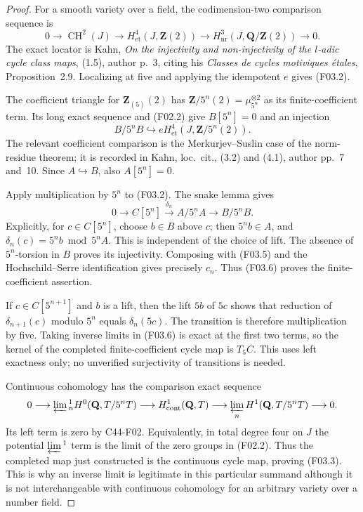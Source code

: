\documentclass[11pt]{article}
\theoremstyle{remark}\newtheorem{remark}[theorem]{Remark}
\begin{document}
\begin{proof}
For a smooth variety over a field, the codimension-two
comparison sequence is
\[
 0\longrightarrow\operatorname{CH}^2(J)
 \longrightarrow H^4_{\mathrm{et}}(J,\mathbf Z(2))
 \longrightarrow H^3_{\mathrm{nr}}(J,\mathbf Q/\mathbf Z(2))
 \longrightarrow0.
\]
The exact locator is Kahn, \emph{On the injectivity and
non-injectivity of the $l$-adic cycle class maps}, (1.5),
author p.~3, citing his \emph{Classes de cycles motiviques
\'etales}, Proposition~2.9.  Localizing at five and applying
the idempotent $e$ gives (F03.2).

The coefficient triangle for $\mathbf Z_{(5)}(2)$ has
$\mathbf Z/5^n(2)=\mu_{5^n}^{\otimes2}$ as its finite-coefficient
term.  Its long exact sequence and (F02.2) give
$B[5^n]=0$ and an injection
\[
 B/5^nB\hookrightarrow
       eH^4_{\mathrm{et}}(J,\mathbf Z/5^n(2)).     \tag{F03.5}
\]
The relevant coefficient comparison is the Merkurjev--Suslin
case of the norm-residue theorem; it is recorded in Kahn,
loc.~cit., (3.2) and (4.1), author pp.~7 and~10.
Since $A\hookrightarrow B$, also $A[5^n]=0$.

Apply multiplication by $5^n$ to (F03.2).  The snake lemma gives
\[
 0\longrightarrow C[5^n]\xrightarrow{\delta_n}A/5^nA
 \longrightarrow B/5^nB.
 \tag{F03.6}
\]
Explicitly, for $c\in C[5^n]$, choose $b\in B$ above $c$;
then $5^n b\in A$, and
$\delta_n(c)=5^n b\bmod5^nA$.  This is independent of the
choice of lift.  The absence of $5^n$-torsion in $B$ proves
its injectivity.  Composing with (F03.5) and the
Hochschild--Serre identification gives precisely $c_n$.
Thus (F03.6) proves the finite-coefficient assertion.

If $c\in C[5^{n+1}]$ and $b$ is a lift, then the lift $5b$
of $5c$ shows that reduction of $\delta_{n+1}(c)$ modulo $5^n$
equals $\delta_n(5c)$.  The transition is therefore multiplication
by five.  Taking inverse limits in (F03.6) is exact at the first
two terms, so the kernel of the completed finite-coefficient
cycle map is $T_5C$.  This uses left exactness only; no
unverified surjectivity of transitions is needed.

Continuous cohomology has the comparison exact sequence
\[
 0\longrightarrow\varprojlim{}^1_n
       H^0(\mathbf Q,T/5^nT)
 \longrightarrow H^1_{\mathrm{cont}}(\mathbf Q,T)
 \longrightarrow\varprojlim_n H^1(\mathbf Q,T/5^nT)
 \longrightarrow0.
\]
Its left term is zero by C44-F02.  Equivalently, in total
degree four on $J$ the potential $\varprojlim{}^1$ term is the
limit of the zero groups in (F02.2).  Thus the completed map
just constructed is the continuous cycle map, proving (F03.3).
This is why an inverse limit is legitimate in this particular
summand although it is not interchangeable with continuous
cohomology for an arbitrary variety over a number field.


\end{proof}
\end{document}
